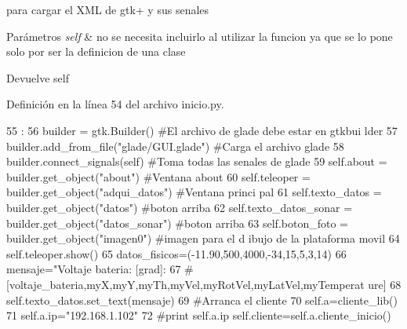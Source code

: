 para cargar el XML de gtk+ y sus senales 


\begin{DoxyParams}{Parámetros}
{\em self} & no se necesita incluirlo al utilizar la funcion ya que se lo pone solo por ser la definicion de una clase \\
\hline
\end{DoxyParams}
\begin{DoxyReturn}{Devuelve}
self 
\end{DoxyReturn}


Definición en la línea 54 del archivo inicio.py.


\begin{DoxyCode}
55                           :
56                 builder = gtk.Builder() #El archivo de glade debe estar en gtkbui
      lder
57                 builder.add_from_file("glade/GUI.glade") #Carga el archivo glade
58                 builder.connect_signals(self) #Toma todas las senales de glade
59                 self.about = builder.get_object("about") #Ventana about
60                 self.teleoper = builder.get_object("adqui_datos") #Ventana princi
      pal
61                 self.texto_datos = builder.get_object("datos") #boton arriba
62                 self.texto_datos_sonar = builder.get_object("datos_sonar") #boton
       arriba
63                 self.boton_foto = builder.get_object("imagen0") #imagen para el d
      ibujo de la plataforma movil
64                 self.teleoper.show()
65                 datos_fisicos=(-11.90,500,4000,-34,15,5,3,14)
66                 mensaje="Voltaje bateria: %
       [grad]\nvelocidad: %
67                 #[voltaje_bateria,myX,myY,myTh,myVel,myRotVel,myLatVel,myTemperat
      ure]
68                 self.texto_datos.set_text(mensaje)
69                 #Arranca el cliente
70                 self.a=cliente_lib()
71                 self.a.ip="192.168.1.102"
72                 #print self.a.ip
                self.cliente=self.a.cliente_inicio() 
\end{DoxyCode}


